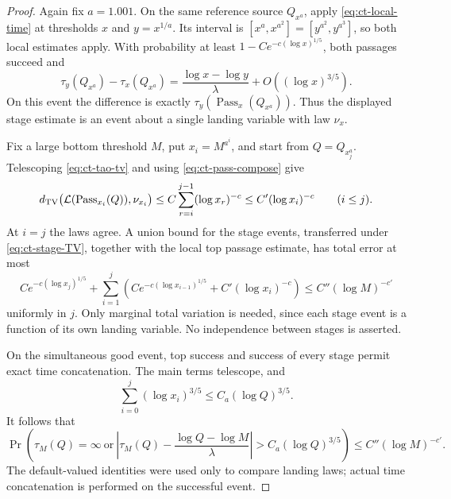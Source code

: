 \documentclass[11pt,a4paper]{article}
\begin{document}
\begin{proof}
Again fix \(a=1.001\). On the same reference source
\(Q_{x^a}\), apply \eqref{eq:ct-local-time} at thresholds
\(x\) and \(y=x^{1/a}\). Its interval is
\([x^a,x^{a^2}]=[y^{a^2},y^{a^3}]\), so both local estimates
apply. With probability at least
\(1-Ce^{-c(\log x)^{1/5}}\), both passages succeed and
\[
 \tau_y(Q_{x^a})-\tau_x(Q_{x^a})
       =\frac{\log x-\log y}{\lambda}
                       +O((\log x)^{3/5}).
\]
On this event the difference is exactly
\(\tau_y(\operatorname{Pass}_x(Q_{x^a}))\).
Thus the displayed stage estimate is an event about a single
landing variable with law \(\nu_x\).

Fix a large bottom threshold \(M\), put \(x_i=M^{a^i}\), and
start from \(Q=Q_{x_j^a}\). Telescoping
\eqref{eq:ct-tao-tv} and using \eqref{eq:ct-pass-compose} give
\begin{equation}\label{eq:ct-stage-TV}
 d_{\rm TV}\bigl(\mathcal L(\operatorname{Pass}_{x_i}(Q)),
                 \nu_{x_i}\bigr)
 \le C\sum_{r=i}^{j-1}(\log x_r)^{-c}
 \le C'(\log x_i)^{-c}\qquad(i\le j).
\end{equation}
At \(i=j\) the laws agree. A union bound for the stage events,
transferred under \eqref{eq:ct-stage-TV}, together with the local
top passage estimate, has total error at most
\[
 Ce^{-c(\log x_j)^{1/5}}
 +\sum_{i=1}^j
   \left(Ce^{-c(\log x_{i-1})^{1/5}}
                           +C'(\log x_i)^{-c}\right)
 \le C''(\log M)^{-c'}
\]
uniformly in \(j\). Only marginal total variation is needed,
since each stage event is a function of its own landing variable.
No independence between stages is asserted.

On the simultaneous good event, top success and success of every
stage permit exact time concatenation. The main terms telescope,
and
\[
 \sum_{i=0}^j(\log x_i)^{3/5}
       \le C_a(\log Q)^{3/5}.
\]
It follows that
\begin{equation}\label{eq:ct-global-time-M}
 \Pr\left(\tau_M(Q)=\infty\ \text{or}\
  \left|\tau_M(Q)-\frac{\log Q-\log M}{\lambda}\right|
                   >C_a(\log Q)^{3/5}\right)
       \le C''(\log M)^{-c'}.
\end{equation}
The default-valued identities were used only to compare landing
laws; actual time concatenation is performed on the successful event.


\end{proof}
\end{document}
